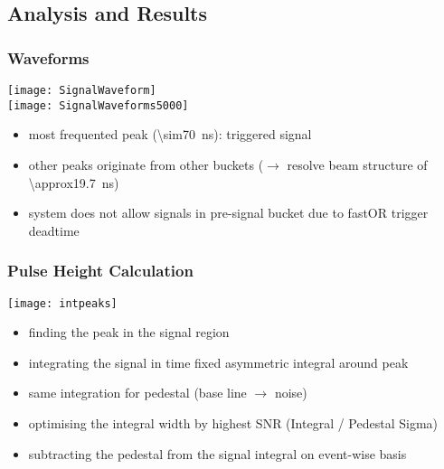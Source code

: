 \subsection{Analysis and Results}
\begin{frame}
	\frametitle{Waveforms}
	\vspace*{-20pt}
	\begin{center}
		\texttt{[image: SignalWaveform]}\\
		\texttt{[image: SignalWaveforms5000]}
	\end{center}
	\begin{itemize}
		\item most frequented peak (\SI{\sim70}{ns}): triggered signal
		\item other peaks originate from other buckets ($\rightarrow$ resolve beam structure of \SI{\approx19.7}{ns})
		\item system does not allow signals in pre-signal bucket due to fastOR trigger deadtime
	\end{itemize}
\end{frame}
\begin{frame}
	\frametitle{Pulse Height Calculation}
	\begin{center}
		\texttt{[image: intpeaks]}\\
	\end{center}
	\begin{itemize}
		\setlength{\itemsep}{\fill}
		\item finding the peak in the signal region
		\item integrating the signal in time fixed asymmetric integral around peak
		\item same integration for pedestal (base line $\rightarrow$ noise)
		\item optimising the integral width by highest SNR (Integral / Pedestal Sigma)
		\item subtracting the pedestal from the signal integral on event-wise basis 
	\end{itemize}
\end{frame}
